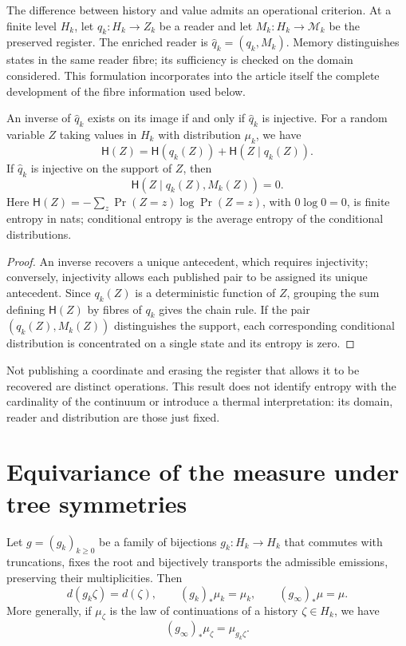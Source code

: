 The difference between history and value admits an operational criterion. At a
finite level \(H_k\), let \(q_k:H_k\to Z_k\) be a reader and let
\(M_k:H_k\to\mathcal M_k\) be the preserved register. The enriched reader
is \(\widehat q_k=(q_k,M_k)\). Memory distinguishes states in the same
reader fibre; its sufficiency is checked on the domain considered.
This formulation incorporates into the article itself the complete development of the
fibre information used below.

\begin{proposition}
\label{x_reciprocidad:prop:ch-recuperabilidad-fibra}
An inverse of \(\widehat q_k\) exists on its image if and only if
\(\widehat q_k\) is injective. For a random variable \(Z\) taking
values in \(H_k\) with distribution \(\mu_k\), we have
\[
 \mathsf H(Z)=\mathsf H(q_k(Z))+\mathsf H(Z\mid q_k(Z)).
\]
If \(\widehat q_k\) is injective on the support of \(Z\), then
\[
 \mathsf H(Z\mid q_k(Z),M_k(Z))=0.
\]
Here \(\mathsf H(Z)=-\sum_z\Pr(Z=z)\log\Pr(Z=z)\), with
\(0\log0=0\), is finite entropy in nats; conditional entropy is
the average entropy of the conditional distributions.
\end{proposition}

\begin{proof}
An inverse recovers a unique antecedent, which requires injectivity;
conversely, injectivity allows each published pair to be assigned its unique
antecedent. Since \(q_k(Z)\) is a deterministic function of \(Z\),
grouping the sum defining \(\mathsf H(Z)\) by fibres of \(q_k\) gives the
chain rule. If the pair \((q_k(Z),M_k(Z))\) distinguishes the support,
each corresponding conditional distribution is concentrated on a single
state and its entropy is zero.
\end{proof}

Not publishing a coordinate and erasing the register that allows it to be recovered are
distinct operations. This result does not identify entropy with the cardinality
of the continuum or introduce a thermal interpretation: its domain, reader and
distribution are those just fixed.

\section{Equivariance of the measure under tree symmetries}
\label{x_reciprocidad:sec:ch-naturalidad-medida}

\begin{proposition}
\label{x_reciprocidad:prop:ch-naturalidad-medida}
Let \(g=(g_k)_{k\geq0}\) be a family of bijections \(g_k:H_k\to H_k\)
that commutes with truncations, fixes the root and bijectively transports
the admissible emissions, preserving their multiplicities. Then
\[
 d(g_k\zeta)=d(\zeta),\qquad
 (g_k)_*\mu_k=\mu_k,\qquad (g_\infty)_*\mu=\mu.
\]
More generally, if \(\mu_\zeta\) is the law of continuations of a
history \(\zeta\in H_k\), we have
\[
 (g_\infty)_*\mu_\zeta=\mu_{g_k\zeta}.
\]
\end{proposition}

